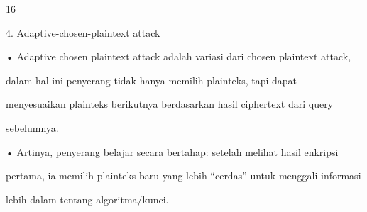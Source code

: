 \documentclass{article}
\begin{document}

16

4. Adaptive-chosen-plaintext attack

• Adaptive chosen plaintext attack adalah variasi dari chosen plaintext attack, 

dalam hal ini penyerang tidak hanya memilih plainteks, tapi dapat 

menyesuaikan plainteks berikutnya berdasarkan hasil ciphertext dari query 

sebelumnya.

• Artinya, penyerang belajar secara bertahap: setelah melihat hasil enkripsi 

pertama, ia memilih plainteks baru yang lebih “cerdas” untuk menggali informasi 

lebih dalam tentang algoritma/kunci.
\end{document}
